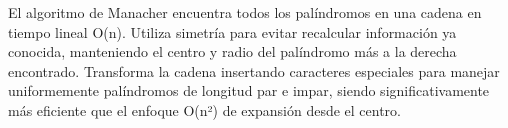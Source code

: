 \markdownRendererDocumentBegin
\markdownRendererSectionBegin
{}\markdownRendererInterblockSeparator
{}El algoritmo de Manacher encuentra todos los palíndromos en una cadena en tiempo lineal \markdownRendererDollarSign{}O(n)\markdownRendererDollarSign{}. Utiliza simetría para evitar recalcular información ya conocida, manteniendo el centro y radio del palíndromo más a la derecha encontrado. Transforma la cadena insertando caracteres especiales para manejar uniformemente palíndromos de longitud par e impar, siendo significativamente más eficiente que el enfoque \markdownRendererDollarSign{}O(n²)\markdownRendererDollarSign{} de expansión desde el centro.\markdownRendererInterblockSeparator
{}
\markdownRendererSectionEnd \markdownRendererDocumentEnd